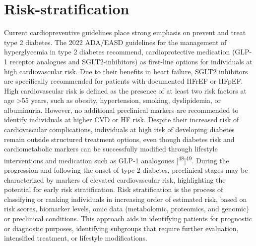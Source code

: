 \documentclass[
  a4paper,
  headsepline=true,
  open=any]{scrbook}
\begin{document}
\hypertarget{risk-stratification}{%
\section{Risk-stratification}\label{risk-stratification}}

Current cardiopreventive guidelines place strong emphasis on prevent and
treat type 2 diabetes. The 2022 ADA/EASD guidelines for the management
of hyperglycemia in type 2 diabetes recommend, cardioprotective
medication (GLP-1 receptor analogues and SGLT2-inhibitors) as first-line
options for individuals at high cardiovascular risk. Due to their
benefits in heart failure, SGLT2 inhibitors are specifically recommended
for patients with documented HFrEF or HFpEF. High cardiovascular risk is
defined as the presence of at least two risk factors at age
\textgreater55 years, such as obesity, hypertension, smoking,
dyslipidemia, or albuminuria. However, no additional preclinical markers
are recommended to identify individuals at higher CVD or HF risk.
Despite their increased risk of cardiovascular complications,
individuals at high risk of developing diabetes remain outside
structured treatment options, even though diabetes risk and
cardiometabolic markers can be successfully modified through lifestyle
interventions and medication such as GLP-1 analogoues
{[}\textsuperscript{48}{]}\textsuperscript{49}. During the progression
and following the onset of type 2 diabetes, preclinical stages may be
characterized by markers of elevated cardiovascular risk, highlighting
the potential for early risk stratification. Risk stratification is the
process of classifying or ranking individuals in increasing order of
estimated risk, based on risk scores, biomarker levels, omic data
(metabolomic, proteomics, and genomic) or preclinical conditions. This
approach aids in identifying patients for prognostic or diagnostic
purposes, identifying subgroups that require further evaluation,
intensified treatment, or lifestyle modifications.
\end{document}
